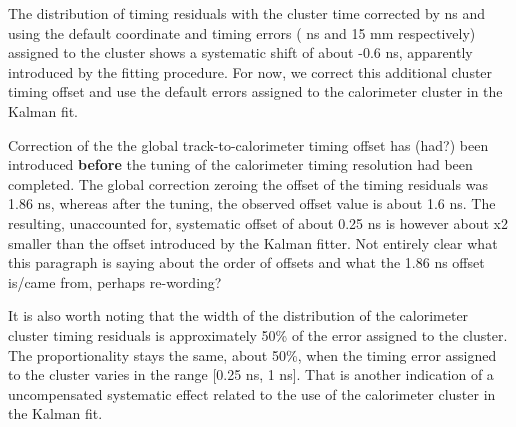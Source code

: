 {\blue The d}istribution of timing residuals with the cluster time corrected by 
 { ns} and {\blue using the} default 
{\blue coordinate and timing} errors ( { ns and 15 mm respectively}) 
assigned to the cluster shows a systematic shift of about  {-0.6 ns},
apparently introduced by the fitting procedure.
{\blue For now, we correct this additional cluster timing offset and use the default errors 
assigned to the calorimeter cluster in the Kalman fit.}


Correction of the the global track-to-calorimeter timing offset  {\blue has (had?)} been introduced {\bf before} 
the tuning of the calorimeter timing resolution  {\blue had} been completed. The global correction zeroing the offset
of the timing residuals was 1.86 ns, whereas after the tuning, the observed offset value is about 1.6 ns.
{\blue The r}esulting{\blue , un}accounted for{\blue ,} systematic offset of about 0.25 ns is however about x2 smaller than the offset
introduced by the Kalman fitter. {\blue Not entirely clear what this paragraph is saying about the order of offsets
and what the 1.86 ns offset is/came from, perhaps re-wording?}

It is also worth noting that the width of the distribution of the calorimeter cluster timing residuals is
approximately 50\% of the error assigned to the cluster. The proportionality stays the same, about 50\%,  
when the timing error assigned to the cluster varies in the range [0.25 ns, 1 ns]. That is another indication
of a {\blue un}compensated systematic effect related to the use of the calorimeter cluster in the Kalman fit.

